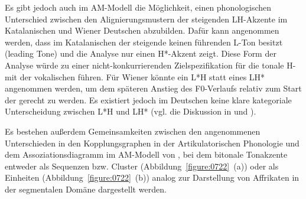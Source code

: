 Es gibt jedoch auch im AM-Modell die Möglichkeit, einen phonologischen Unterschied zwischen den Alignierungsmustern der  steigenden LH-Akzente im Katalanischen und Wiener Deutschen abzubilden. Dafür kann angenommen werden, dass im Katalanischen der steigende  keinen führenden L-Ton besitzt (leading Tone) und die Analyse nur einen H*-Akzent zeigt. Diese Form der Analyse würde zu einer nicht-konkurrierenden Zielspezifikation für die tonale H- mit der vokalischen  führen. Für Wiener  könnte ein L*H statt eines LH* angenommen werden, um dem späteren Anstieg des F0-Verlaufs relativ zum Start der  gerecht zu werden. Es existiert jedoch im Deutschen keine klare kategoriale Unterscheidung zwischen L*H und LH* (vgl. die Diskussion in \citealt{Braun2003} und \citealt{Braun2007}).



Es bestehen außerdem Gemeinsamkeiten zwischen den angenommenen Unterschieden in den Kopplungsgraphen in der Artikulatorischen Phonologie und dem Assoziationsdiagramm im AM-Modell von \citet{Grice1995}, bei dem bitonale Tonakzente entweder als Sequenzen bzw. Cluster (Abbildung~\ref{figure:0722}~(a)) oder als Einheiten (Abbildung~\ref{figure:0722}~(b)) analog zur Darstellung von Affrikaten in der segmentalen Domäne \citep{Yip1989} dargestellt werden.


